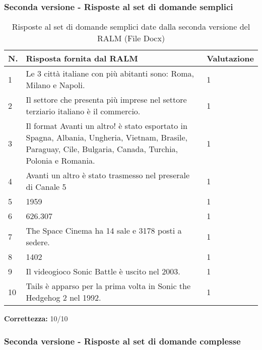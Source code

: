 \subsubsection{Seconda versione - Risposte al set di domande semplici}

\begin{table}[H]
    \centering
    \begin{tabular}{|p{0.5cm} |p{6cm} |p{2cm}|}
        \hline
        \textbf{N}. & \textbf{Risposta fornita dal RALM} & \textbf{Valutazione} \\
        \hline
        1 & Le 3 città italiane con più abitanti sono: Roma, Milano e Napoli. & 1 \\
        \hline
        2 & Il settore che presenta più imprese nel settore terziario italiano è il commercio. & 1 \\
        \hline
        3 & Il format Avanti un altro! è stato esportato in Spagna, Albania, Ungheria, Vietnam, Brasile, Paraguay, Cile, Bulgaria, Canada, Turchia, Polonia e Romania. & 1 \\
        \hline
        4 & Avanti un altro è stato trasmesso  nel preserale di Canale 5 & 1 \\
        \hline
        5 & 1959 & 1 \\
        \hline
        6 & 626.307 & 1 \\
        \hline
        7 & The Space Cinema ha 14 sale e 3178 posti a sedere. & 1 \\
        \hline
        8 & 1402 & 1 \\
        \hline
        9 & Il videogioco Sonic Battle è uscito nel 2003. & 1 \\
        \hline
        10 & Tails è apparso per la prima volta in Sonic the Hedgehog 2 nel 1992. & 1 \\
        \hline
    \end{tabular}
    \caption{Risposte al set di domande semplici date dalla seconda versione del RALM (File Docx)}
\end{table}

\textbf{Correttezza:} 10/10

\subsubsection{Seconda versione - Risposte al set di domande complesse}


